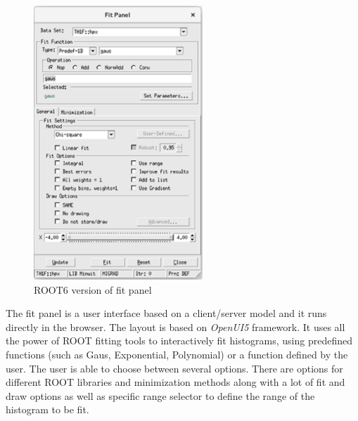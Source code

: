 \documentclass[a4paper]{jpconf}
\begin{document}
\begin{figure}[h]
\begin{minipage}{14pc}
\includegraphics[width=15pc]{oldPanel.eps}
\caption{\label{label}ROOT6 version of fit panel}
\end{minipage}
\end{figure}

The fit panel is a user interface based on a client/server model and it runs directly in the browser. The layout is based on \textit{OpenUI5} framework. It uses all the power of ROOT fitting tools to interactively fit histograms, using predefined functions (such as Gaus, Exponential, Polynomial)  or a function defined by the user. The user is able to choose between several options. There are options for different ROOT libraries and minimization methods along with a lot of fit and draw options as well as specific range selector to define the range of the histogram to be fit.
\end{document}

